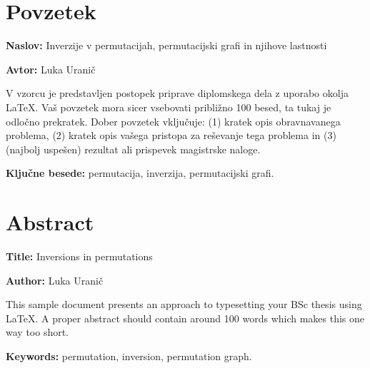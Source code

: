 \documentclass[a4paper, 12pt]{book}
\newcommand{\ttitle}{Inverzije v permutacijah, permutacijski grafi in njihove lastnosti}
\newcommand{\ttitleEn}{Inversions in permutations}
\newcommand{\tauthor}{Luka Uranič}
\newcommand{\tkeywords}{permutacija, inverzija, permutacijski grafi}
\newcommand{\tkeywordsEn}{permutation, inversion, permutation graph}
\newcommand{\clearemptydoublepage}{\newpage{\pagestyle{empty}\cleardoublepage}}
\begin{document}
\clearemptydoublepage

\chapter*{Povzetek}

\noindent\textbf{Naslov:} \ttitle
\bigskip

\noindent\textbf{Avtor:} \tauthor
\bigskip

\noindent V vzorcu je predstavljen postopek priprave diplomskega dela z uporabo okolja \LaTeX. Vaš povzetek mora sicer vsebovati približno 100 besed, ta tukaj je odločno prekratek.
Dober povzetek vključuje: (1) kratek opis obravnavanega problema, (2) kratek opis vašega pristopa za reševanje tega problema in (3) (najbolj uspešen) rezultat ali prispevek magistrske naloge.

\bigskip

\noindent\textbf{Ključne besede:} \tkeywords.
\clearemptydoublepage

\chapter*{Abstract}

\noindent\textbf{Title:} \ttitleEn
\bigskip

\noindent\textbf{Author:} \tauthor
\bigskip

\noindent This sample document presents an approach to typesetting your BSc thesis using \LaTeX. 
A proper abstract should contain around 100 words which makes this one way too short.
\bigskip

\noindent\textbf{Keywords:} \tkeywordsEn.
\clearemptydoublepage

\mainmatter
\setcounter{page}{1}
\pagestyle{fancy}

\end{document}
